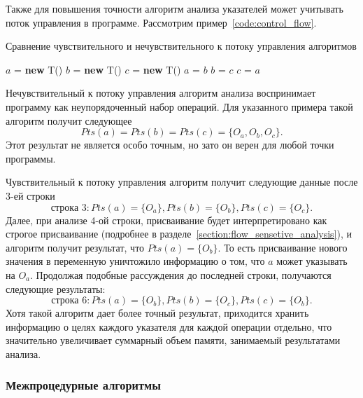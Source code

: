 \documentclass[14pt,titlepage]{extarticle}
\newcommand{\NEW}{\textbf{new }}
\begin{document}
        Также для повышения точности алгоритм анализа указателей может
        учитывать поток управления в программе.
        Рассмотрим пример~\ref{code:control_flow}.
        \begin{algorithm}
          \caption{Сравнение чувствительного и нечувствительного к потоку
                   управления алгоритмов}
          \label{code:control_flow}
          \begin{algorithmic}[1]
            \STATE $a$ = \NEW T()
            \STATE $b$ = \NEW T()
            \STATE $c$ = \NEW T()
            \STATE $a$ = $b$
            \STATE $b$ = $c$
            \STATE $c$ = $a$
          \end{algorithmic}
        \end{algorithm}

        Нечувствительный к потоку управления алгоритм анализа воспринимает
        программу как неупорядоченный набор операций.
        Для указанного примера такой алгоритм получит следующее
        \[Pts(a) = Pts(b) = Pts(c) = \{O_a, O_b, O_c\}.\]
        Этот результат не является особо точным, но зато он верен
        для любой точки программы.

        Чувствительный к потоку управления алгоритм получит следующие данные
        после 3-ей строки
        \[\textrm{строка 3}:
            Pts(a) = \{O_a\}, Pts(b) = \{O_b\}, Pts(c) = \{O_c\}.\]
        Далее, при анализе 4-ой строки, присваивание будет интерпретировано
        как строгое присваивание (подробнее в
        разделе~\ref{section:flow_sensetive_analysis}), и алгоритм получит
        результат, что $Pts(a) = \{O_b\}$. То есть присваивание нового значения
        в переменную уничтожило информацию о том, что $a$ может указывать на
        $O_a$. Продолжая подобные рассуждения до последней строки, получаются
        следующие результаты:
        \[\textrm{строка 6}:
            Pts(a) = \{O_b\}, Pts(b) = \{O_c\}, Pts(c) = \{O_b\}.\]
        Хотя такой алгоритм дает более точный результат, приходится хранить
        информацию о целях каждого указателя для каждой операции отдельно,
        что значительно увеличивает суммарный объем памяти, занимаемый
        результатами анализа.

      \subsubsection{Межпроцедурные алгоритмы}
\end{document}
